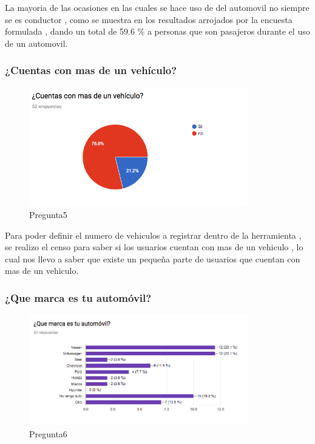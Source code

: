 La mayoria de las ocasiones en las cuales se hace uso de del automovil no siempre se es conductor , como se muestra en los resultados arrojados por la encuesta formulada , dando un total de 59.6 \% a personas que son pasajeros durante el uso de un automovil.\\


\subsubsection{¿Cuentas con mas de un vehículo?}

\begin{figure}[htbp!]
	\begin{center}
		\includegraphics[width=0.85\textwidth]{DisenoEstructura/imagenes/Pregunta5}
		\caption{Pregunta5}
		\label{DE/FO/Pregunta5}
	\end{center}
\end{figure}

Para poder definir el numero de vehiculos a registrar dentro de la herramienta , se realizo el censo para saber si los usuarios cuentan con mas de un vehiculo , lo cual nos llevo a saber que existe un pequeña parte de usuarios que cuentan con mas de un vehiculo.\\

\subsubsection{¿Que marca es tu automóvil?}

\begin{figure}[htbp!]
	\begin{center}
		\includegraphics[width=0.85\textwidth]{DisenoEstructura/imagenes/Pregunta6}
		\caption{Pregunta6}
		\label{DE/FO/Pregunta6}
	\end{center}
\end{figure}

